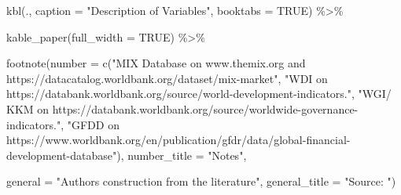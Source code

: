 \documentclass[a4paper,nobind]{templates/ociamthesis}
\newenvironment{Shaded}{\begin{snugshade}}{\end{snugshade}}
\newcommand{\AttributeTok}[1]{\textcolor[rgb]{0.77,0.63,0.00}{#1}}
\newcommand{\ConstantTok}[1]{\textcolor[rgb]{0.00,0.00,0.00}{#1}}
\newcommand{\FunctionTok}[1]{\textcolor[rgb]{0.00,0.00,0.00}{#1}}
\newcommand{\NormalTok}[1]{#1}
\newcommand{\SpecialCharTok}[1]{\textcolor[rgb]{0.00,0.00,0.00}{#1}}
\newcommand{\StringTok}[1]{\textcolor[rgb]{0.31,0.60,0.02}{#1}}
\renewenvironment{Shaded}
{
  \vspace{10pt}%
  \begin{snugshade}%
}{%
  \end{snugshade}%
  \vspace{8pt}%
}
\begin{document}
\begin{Shaded}
\begin{Highlighting}[]
  \FunctionTok{kbl}\NormalTok{(., }\AttributeTok{caption =} \StringTok{"Description of Variables"}\NormalTok{, }\AttributeTok{booktabs =} \ConstantTok{TRUE}\NormalTok{) }\SpecialCharTok{\%\textgreater{}\%} 
  
  \FunctionTok{kable\_paper}\NormalTok{(}\AttributeTok{full\_width =} \ConstantTok{TRUE}\NormalTok{) }\SpecialCharTok{\%\textgreater{}\%} 
  
  \FunctionTok{footnote}\NormalTok{(}\AttributeTok{number =} \FunctionTok{c}\NormalTok{(}\StringTok{"MIX Database on www.themix.org and https://datacatalog.worldbank.org/dataset/mix{-}market"}\NormalTok{, }\StringTok{"WDI on https://databank.worldbank.org/source/world{-}development{-}indicators."}\NormalTok{, }\StringTok{"WGI/ KKM on https://databank.worldbank.org/source/worldwide{-}governance{-}indicators."}\NormalTok{, }\StringTok{"GFDD on https://www.worldbank.org/en/publication/gfdr/data/global{-}financial{-}development{-}database"}\NormalTok{), }\AttributeTok{number\_title =} \StringTok{"Notes"}\NormalTok{,}
    
           \AttributeTok{general =} \StringTok{"Authors\textquotesingle{} construction from the literature"}\NormalTok{,}
           \AttributeTok{general\_title =} \StringTok{"Source: "}\NormalTok{)}
\end{Highlighting}
\end{Shaded}
\end{document}
